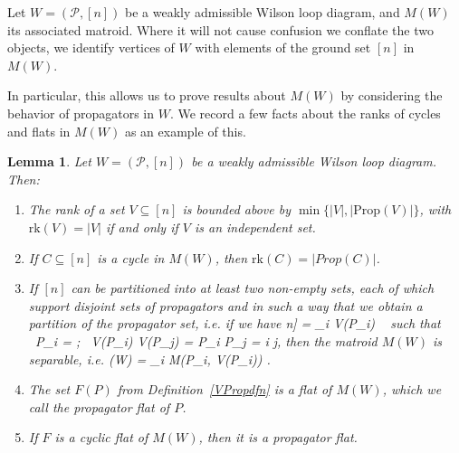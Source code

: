 \documentclass[11pt]{article}
\newcommand{\rk}{\textrm{rk} }
\def\bas #1\eas{\begin{align*} #1 \end{align*}}
\newcommand{\cP}{\mathcal{P}}
\newcommand{\Prop}{\textrm{Prop}}
\newtheorem{lem}[thm]{Lemma}
\theoremstyle{remark}
\theoremstyle{definition}
\begin{document}


Let $W = (\cP,[n])$ be a weakly admissible Wilson loop diagram, and $M(W)$ its associated matroid. Where it will not cause confusion we conflate the two objects, we identify vertices of $W$ with elements of the ground set $[n]$ in $M(W)$. 

In particular, this allows us to prove results about $M(W)$ by considering the behavior of propagators in $W$. We record a few facts about the ranks of cycles and flats in $M(W)$ as an example of this.

\begin{lem}\label{lem facts about WLD matroids}
Let $W = (\cP,[n])$ be a weakly admissible Wilson loop diagram. Then:
\begin{enumerate}
\item The rank of a set $V \subseteq [n]$ is bounded above by $\min\{|V|,|\Prop(V)|\}$, with $\rk(V) = |V|$ if and only if $V$ is an independent set.
\item If $C \subseteq [n]$ is a cycle in $M(W)$, then $\rk(C) = |Prop(C)|$.
\item If $[n]$ can be partitioned into at least two non-empty sets, each of which support disjoint sets of propagators and in such a way that we obtain a partition of the propagator set, i.e. if we have \bas [n] = \sqcup_i V(P_i) \ \textrm{ such that } \ \sqcup P_i = \cP; \   V(P_i) \cap V(P_j) = \emptyset {} P_i \cap P_j = \emptyset \quad \forall i \neq j\;, \eas then the matroid $M(W)$ is separable, i.e. \bas M(W) = \bigoplus_i M(P_i, V(P_i)) \;.\eas 
\item The set $F(P)$ from Definition~\ref{VPropdfn} is a flat of $M( W)$, which we call the \emph{propagator flat} of $P$.
\item If $F$ is a cyclic flat of $M(W)$, then it is a propagator flat.
\end{enumerate}
\end{lem}
\end{document}
